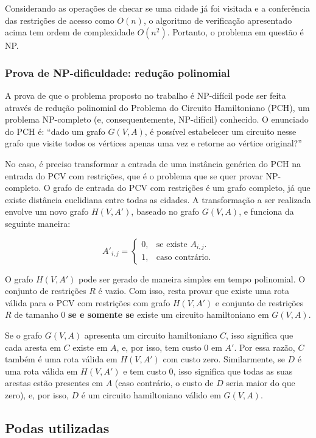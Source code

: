 \documentclass[10pt,a4paper]{article}
\numberwithin{equation}{section}
\begin{document}
Considerando as operações de checar se uma cidade já foi visitada e a conferência das restrições de acesso como $O(n)$, o algoritmo de verificação apresentado acima tem ordem de complexidade $O(n^2)$. Portanto, o problema em questão é NP.

\subsubsection{Prova de NP-dificuldade: redução polinomial}

A prova de que o problema proposto no trabalho é NP-difícil pode ser feita através de redução polinomial do Problema do Circuito Hamiltoniano (PCH), um problema NP-completo (e, consequentemente, NP-difícil) conhecido. O enunciado do PCH é: ``dado um grafo $G(V,A)$, é possível estabelecer um circuito nesse grafo que visite todos os vértices apenas uma vez e retorne ao vértice original?''

No caso, é preciso transformar a entrada de uma instância genérica do PCH na entrada do PCV com restrições, que é o problema que se quer provar NP-completo. O grafo de entrada do PCV com restrições é um grafo completo, já que existe distância euclidiana entre todas as cidades. A transformação a ser realizada envolve um novo grafo $H(V,A')$, baseado no grafo $G(V,A)$, e funciona da seguinte maneira:

\[
    A'_{i,j}=\begin{cases}
        0, & \text{se existe $A_{i,j}$.}\\
        1, & \text{caso contrário.} 
    \end{cases}
\]

O grafo $H(V,A')$ pode ser gerado de maneira simples em tempo polinomial. O conjunto de restrições $R$ é vazio. Com isso, resta provar que existe uma rota válida para o PCV com restrições com grafo $H(V,A')$ e conjunto de restrições $R$ de tamanho 0 \textbf{se e somente se} existe um circuito hamiltoniano em $G(V,A)$.

Se o grafo $G(V,A)$ apresenta um circuito hamiltoniano $C$, isso significa que cada aresta em $C$ existe em $A$, e, por isso, tem custo 0 em $A'$. Por essa razão, $C$ também é uma rota válida em $H(V,A')$ com custo zero. Similarmente, se $D$ é uma rota válida em $H(V,A')$ e tem custo 0, isso significa que todas as suas arestas estão presentes em $A$ (caso contrário, o custo de $D$ seria maior do que zero), e, por isso, $D$ é um circuito hamiltoniano válido em $G(V,A)$.

\subsection{Podas utilizadas}
\end{document}
